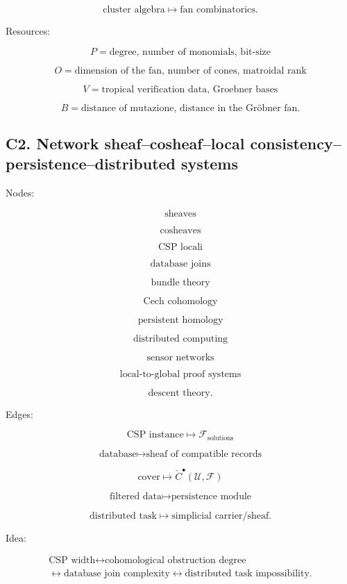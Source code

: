 \documentclass[11pt]{article}
\begin{document}
\[
\text{cluster algebra}\mapsto \text{fan combinatorics}.
\]

Resources:

\[
P=\text{degree, number of monomials, bit-size}
\]

\[
O=\text{dimension of the fan, number of cones, matroidal rank}
\]

\[
V=\text{tropical verification data, Groebner bases}
\]

\[
B=\text{distance of mutazione, distance in the Gröbner fan}.
\]



\subsection{C2. Network sheaf--cosheaf--local consistency--persistence--distributed systems}

Nodes:

\[
\text{sheaves}
\]

\[
\text{cosheaves}
\]

\[
\text{CSP locali}
\]

\[
\text{database joins}
\]

\[
\text{bundle theory}
\]

\[
\text{Cech cohomology}
\]

\[
\text{persistent homology}
\]

\[
\text{distributed computing}
\]

\[
\text{sensor networks}
\]

\[
\text{local-to-global proof systems}
\]

\[
\text{descent theory}.
\]

Edges:

\[
\text{CSP instance}\mapsto \mathcal F_{\text{solutions}}
\]

\[
\text{database}\mapsto \text{sheaf of compatible records}
\]

\[
\text{cover}\mapsto \check C^\bullet(\mathcal U,\mathcal F)
\]

\[
\text{filtered data}\mapsto \text{persistence module}
\]

\[
\text{distributed task}\mapsto \text{simplicial carrier/sheaf}.
\]

Idea:

\[
\begin{gathered}
\text{CSP width}\leftrightarrow\text{cohomological obstruction degree}\\
\leftrightarrow\text{database join complexity}\leftrightarrow\text{distributed task impossibility}.
\end{gathered}
\]
\end{document}
